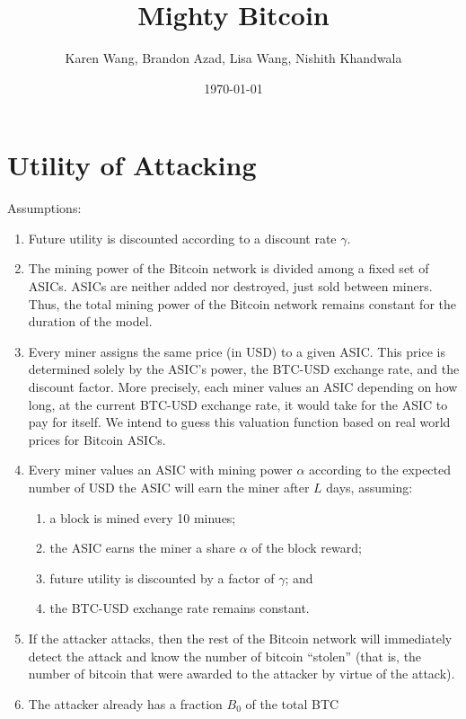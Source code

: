 \documentclass[12pt]{article}
\title{Mighty Bitcoin}
\author{Karen Wang, Brandon Azad, Lisa Wang, Nishith Khandwala}
\date{\today}
\newcommand*{\ABtcOrig}{{B_0}}
\begin{document}
\maketitle

\section{Utility of Attacking}

Assumptions:
\begin{enumerate}
  \item
    Future utility is discounted according to a discount rate $\gamma$.
  \item
    The mining power of the Bitcoin network is divided among a fixed set of
    ASICs. ASICs are neither added nor destroyed, just sold between miners.
    Thus, the total mining power of the Bitcoin network remains constant for
    the duration of the model.
  \item
    Every miner assigns the same price (in USD) to a given ASIC. This price is
    determined solely by the ASIC's power, the BTC-USD exchange rate, and the
    discount factor.
    More precisely, each miner values an ASIC depending on how long, at the
    current BTC-USD exchange rate, it would take for the ASIC to pay for
    itself. We intend to guess this valuation function based on real world
    prices for Bitcoin ASICs.
  \item
    Every miner values an ASIC with mining power $\alpha$ according to the
    expected number of USD the ASIC will earn the miner after $L$ days, assuming:
    \begin{enumerate}
      \item
        a block is mined every 10 minues;
      \item
        the ASIC earns the miner a share $\alpha$ of the block reward;
      \item
        future utility is discounted by a factor of $\gamma$; and
      \item
        the BTC-USD exchange rate remains constant.
    \end{enumerate}
  \item
    If the attacker attacks, then the rest of the Bitcoin network will
    immediately detect the attack and know the number of bitcoin ``stolen''
    (that is, the number of bitcoin that were awarded to the attacker by virtue
    of the attack).
  \item
    The attacker already has a fraction $\ABtcOrig$ of the total BTC

\end{enumerate}
\end{document}
